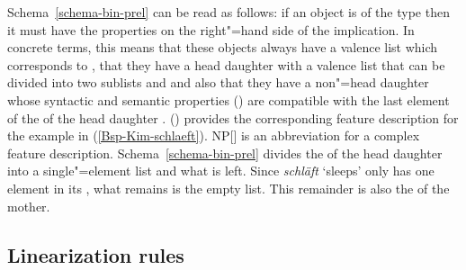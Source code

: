 Schema~\ref{schema-bin-prel} can be read as follows: if an object is of the type  then it must have the properties
on the right"=hand side of the implication. In concrete terms, this means that these objects always have a valence list which corresponds to 
, that they have a head daughter with a valence list that can be divided into two sublists   and  and
also that they have a non"=head daughter whose syntactic and semantic properties (\synsemv) are compatible with the last element of the
\compsl of the head daughter . () provides the corresponding feature description for the example in (\ref{Bsp-Kim-schlaeft}). 
\ea
{}
\z
NP[] is an abbreviation for a complex feature description. Schema~\ref{schema-bin-prel} divides the \compsl of the head daughter into
a single"=element list and what is left. Since \emph{schläft} `sleeps' only has one element in its \compsl, what remains is the empty list.
This remainder is also the \compsv of the mother.

\subsection{Linearization rules}
\label{Abschnitt-LP-Regeln-HPSG}

